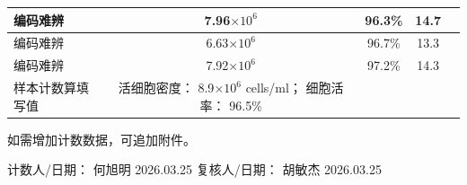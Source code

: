 \documentclass[UTF8,10pt,a4paper,fontset=fandol]{ctexart}
\newcommand{\fieldvalue}[1]{#1}
\newcommand{\handwritten}[1]{#1}
\begin{document}
\begin{tabularx}{\textwidth}{|X|c|c|c|c|}
\\ \hline
\fieldvalue{\handwritten{编码难辨}} &
\fieldvalue{\handwritten{7.96}}\(\times10^6\) &
\fieldvalue{\handwritten{96.3}}\% &
\fieldvalue{\handwritten{14.7}} &
\\ \hline
\fieldvalue{\handwritten{编码难辨}} &
\fieldvalue{\handwritten{6.63}}\(\times10^6\) &
\fieldvalue{\handwritten{96.7}}\% &
\fieldvalue{\handwritten{13.3}} &
\\ \hline
\fieldvalue{\handwritten{编码难辨}} &
\fieldvalue{\handwritten{7.92}}\(\times10^6\) &
\fieldvalue{\handwritten{97.2}}\% &
\fieldvalue{\handwritten{14.3}} &
\\ \hline
样本计数算填写值 &
活细胞密度：
\fieldvalue{\handwritten{8.9}}\(\times10^6\) cells/ml；
细胞活率：
\fieldvalue{\handwritten{96.5}}\%
\\ \hline
\end{tabularx}
\normalsize

\noindent
如需增加计数数据，可追加附件。

\noindent
计数人/日期：
\fieldvalue{\handwritten{何旭明 2026.03.25}}
\qquad
复核人/日期：
\fieldvalue{\handwritten{胡敏杰 2026.03.25}}
\end{document}
